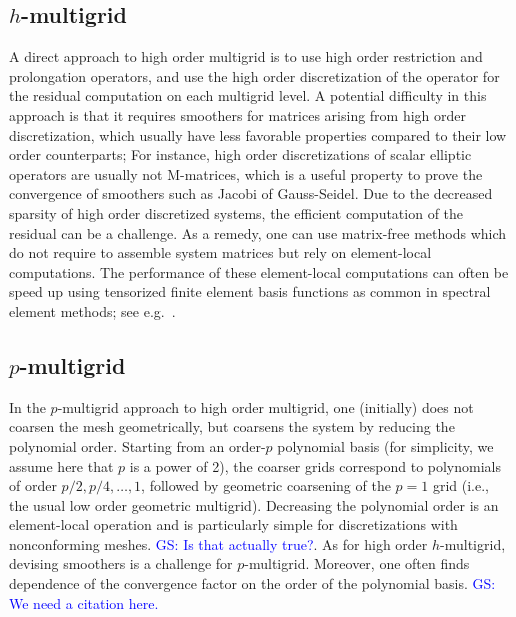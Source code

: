 \documentclass[smallcondensed,final]{svjour3}     %
\newcommand{\gsnote}[1]{\textcolor{blue}{GS: #1}}
\begin{document}
\subsection{$h$-multigrid}\label{subsec:h}
A direct approach to high order multigrid is to use high order
restriction and prolongation operators, and use the high order
discretization of the operator for the residual computation on each
multigrid level.  A potential difficulty in this approach is that it
requires smoothers for matrices arising from high order
discretization, which usually have less favorable properties compared
to their low order counterparts; For instance, high order
discretizations of scalar elliptic operators are usually not
M-matrices, which is a useful property to prove the convergence of
smoothers such as Jacobi of Gauss-Seidel.  Due to the decreased
sparsity of high order discretized systems, the efficient computation
of the residual can be a challenge. As a remedy, one can use
matrix-free methods which do not require to assemble system matrices
but rely on element-local computations. The performance of these
element-local computations can often be speed up using tensorized
finite element basis functions as common in spectral element methods;
see e.g.~\cite{DevilleFischerMund02}.


\subsection{$p$-multigrid}\label{subsec:p}
In the $p$-multigrid approach to high order multigrid, one (initially)
does not coarsen the mesh geometrically, but coarsens the system by
reducing the polynomial order. Starting from an order-$p$ polynomial
basis (for simplicity, we assume here that $p$ is a power of 2), the
coarser grids correspond to polynomials of order $p/2, p/4,\ldots,1$,
followed by geometric coarsening of the $p=1$ grid (i.e., the usual
low order geometric multigrid). Decreasing the polynomial order is an
element-local operation and is particularly simple for discretizations
with nonconforming meshes. \gsnote{Is that actually true?}. As for
high order $h$-multigrid, devising smoothers is a challenge for
$p$-multigrid.  Moreover, one often finds dependence of the
convergence factor on the order of the polynomial basis. \gsnote{We
  need a citation here.}
\end{document}
